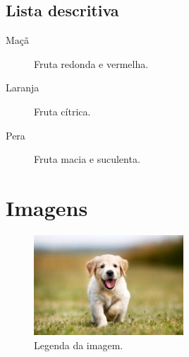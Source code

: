 \documentclass[11pt,letterpaper]{article}
\begin{document}
\subsection{Lista descritiva}
\begin{description}
    \item[Maçã] Fruta redonda e vermelha.
    \item[Laranja] Fruta cítrica.
    \item[Pera] Fruta macia e suculenta.
\end{description}

\section{Imagens}
\begin{figure}[ht]
    \centering
    \includegraphics[width=0.5\textwidth]{imagens/dog.jpg}
    \caption{Legenda da imagem.}
    \label{fig:exemplo}
\end{figure}
\end{document}
